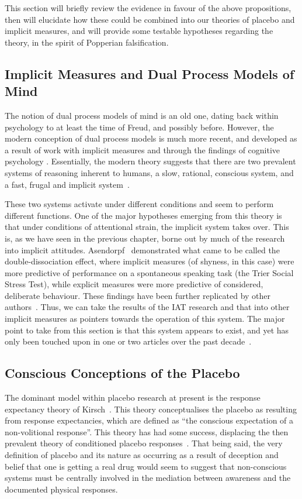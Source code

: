 This section will briefly review the evidence in favour of the above propositions, then will elucidate how these could be combined into our theories of placebo and implicit measures, and will provide some testable hypotheses regarding the theory, in the spirit of Popperian falsification.

\subsection{Implicit Measures and Dual Process Models of Mind}

The notion of dual process models of mind is an old one, dating back within psychology to at least the time of Freud, and possibly before. However, the modern conception of dual process models is much more recent, and developed as a result of work with implicit measures and through the findings of cognitive psychology \cite{Kahneman2002,Greenwald1995a,Gigerenzer2011,Klauer2007}. Essentially, the modern theory suggests that there are two prevalent systems of reasoning inherent to humans, a slow, rational, conscious system, and a fast, frugal and implicit system~\cite{Kahneman2002}. 

These two systems activate under different conditions and seem to perform different functions. One of the major hypotheses emerging from this theory is that under conditions of attentional strain, the implicit system takes over. This is, as we have seen in the previous chapter, borne out by much of the research into implicit attitudes. Asendorpf~\cite{Asendorpf2002} demonstrated what came to be called the double-dissociation effect, where implicit measures (of shyness, in this case) were more predictive of performance on a spontaneous speaking task (the Trier Social Stress Test), while explicit measures were more predictive of considered, deliberate behaviour. These findings have been further replicated by other authors~\cite{Richetin2007}.   Thus, we can take the results of the IAT research and that into other implicit measures as pointers towards the operation of this system. The major point to take from this section is that this system appears to exist, and yet has only been touched upon in one or two articles over the past decade~\cite{Geers2005}. 

\subsection{Conscious Conceptions of the Placebo}

The dominant model within placebo research at present is the response expectancy theory of Kirsch~\cite{Kirsch1985, Kirsch1997}. This theory conceptualises the placebo as resulting from response expectancies, which are defined as ``the conscious expectation of a non-volitional response''. This theory has had some success, displacing the then prevalent theory of conditioned placebo responses~\cite{Voudouris1985,Voudouris1989}. That being said, the very definition of placebo and its nature as occurring as a result of deception and belief that one is getting a real drug would seem to suggest that non-conscious systems must be centrally involved in the mediation between awareness and the documented physical responses. 

